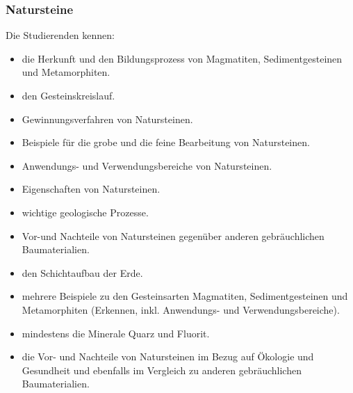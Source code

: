 \subsubsection*{Natursteine}
Die Studierenden kennen: 

\begin{itemize}
	\item die Herkunft und den Bildungsprozess von Magmatiten, Sedimentgesteinen und Metamorphiten. 
	\item den Gesteinskreislauf.
	\item Gewinnungsverfahren von Natursteinen. 
	\item Beispiele für die grobe und die feine Bearbeitung von Natursteinen.
	\item Anwendungs- und Verwendungsbereiche von Natursteinen. 
	\item Eigenschaften von Natursteinen.
	\item wichtige geologische Prozesse. 
	\item Vor-und Nachteile von Natursteinen gegenüber anderen gebräuchlichen Baumaterialien.
	\item den Schichtaufbau der Erde.
	\item mehrere Beispiele zu den Gesteinsarten Magmatiten, Sedimentgesteinen und Metamorphiten (Erkennen, inkl. Anwendungs- und Verwendungsbereiche).
	\item mindestens die Minerale Quarz und Fluorit.
	\item die Vor- und Nachteile von Natursteinen im Bezug auf Ökologie und Gesundheit und ebenfalls im Vergleich zu anderen gebräuchlichen Baumaterialien.
\end{itemize}